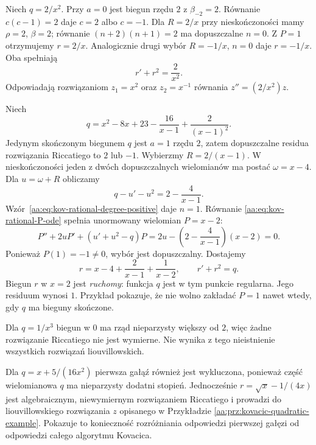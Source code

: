 \begin{przyklad}
\label{aa:prz:kov-rational-double}
Niech $q=2/x^2$.
Przy $a=0$ jest biegun
rzędu $2$ z
$\beta_{-2}=2$.
Równanie $c(c-1)=2$
daje $c=2$ albo $c=-1$.
Dla $R=2/x$ przy
nieskończoności mamy
$\rho=2$, $\beta=2$;
równanie
$(n+2)(n+1)=2$
ma dopuszczalne $n=0$.
Z $P=1$ otrzymujemy
$r=2/x$.
Analogicznie drugi wybór
$R=-1/x$, $n=0$
daje $r=-1/x$.
Oba spełniają
\[
 r'+r^2=\frac2{x^2}.
\]
Odpowiadają rozwiązaniom
$z_1=x^2$ oraz $z_2=x^{-1}$
równania $z''=(2/x^2)z$.
\end{przyklad}

\begin{przyklad}
\label{aa:prz:kov-rational-movable}
Niech
\[
 q=x^2-8x+23-\frac{16}{x-1}
                   +\frac2{(x-1)^2}.
\]
Jedynym skończonym biegunem $q$
jest $a=1$ rzędu $2$,
zatem dopuszczalne residua
rozwiązania Riccatiego to $2$
lub $-1$. Wybierzmy
$R=2/(x-1)$.
W nieskończoności jeden z
dwóch dopuszczalnych
wielomianów ma postać
$\omega=x-4$.
Dla $u=\omega+R$
obliczamy
\[
 q-u'-u^2=2-\frac4{x-1}.
\]
Wzór~\eqref{aa:eq:kov-rational-degree-positive}
daje $n=1$.
Równanie
\eqref{aa:eq:kov-rational-P-ode}
spełnia unormowany
wielomian $P=x-2$:
\[
 P''+2uP'+(u'+u^2-q)P
 =2u-\left(2-\frac4{x-1}\right)(x-2)=0.
\]
Ponieważ $P(1)=-1\ne0$,
wybór jest dopuszczalny.
Dostajemy
\[
 r=x-4+\frac2{x-1}+\frac1{x-2},
 \qquad r'+r^2=q.
\]
Biegun $r$ w $x=2$ jest
\emph{ruchomy}: funkcja $q$
jest w tym punkcie regularna.
Jego residuum wynosi $1$.
Przykład pokazuje, że
nie wolno zakładać
$P=1$ nawet wtedy, gdy
$q$ ma bieguny skończone.
\end{przyklad}

\begin{przyklad}
\label{aa:prz:kov-rational-negative}
Dla $q=1/x^3$
biegun w $0$ ma rząd
nieparzysty większy od $2$,
więc żadne rozwiązanie
Riccatiego nie jest wymierne.
Nie wynika z tego
nieistnienie wszystkich
rozwiązań liouvillowskich.

Dla $q=x+5/(16x^2)$
pierwsza gałąź również
jest wykluczona,
ponieważ część wielomianowa
$q$ ma nieparzysty
dodatni stopień.
Jednocześnie
$r=\sqrt{x}-1/(4x)$
jest algebraicznym,
niewymiernym rozwiązaniem
Riccatiego i prowadzi
do liouvillowskiego
rozwiązania $z$ opisanego
w Przykładzie
\ref{aa:prz:kovacic-quadratic-example}.
Pokazuje to konieczność
rozróżniania odpowiedzi
pierwszej gałęzi
od odpowiedzi całego
algorytmu Kovacica.
\end{przyklad}

